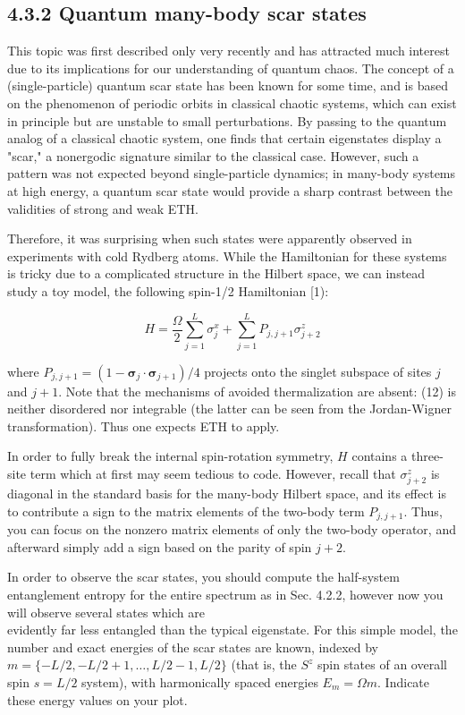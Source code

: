 \documentclass[12pt]{article}
\begin{document}
\subsection*{4.3.2 Quantum many-body scar states}
This topic was first described only very recently and has attracted much interest due to its implications for our understanding of quantum chaos. The concept of a (single-particle) quantum scar state has been known for some time, and is based on the phenomenon of periodic orbits in classical chaotic systems, which can exist in principle but are unstable to small perturbations. By passing to the quantum analog of a classical chaotic system, one finds that certain eigenstates display a "scar," a nonergodic signature similar to the classical case. However, such a pattern was not expected beyond single-particle dynamics; in many-body systems at high energy, a quantum scar state would provide a sharp contrast between the validities of strong and weak ETH.

Therefore, it was surprising when such states were apparently observed in experiments with cold Rydberg atoms. While the Hamiltonian for these systems is tricky due to a complicated structure in the Hilbert space, we can instead study a toy model, the following spin-1/2 Hamiltonian [1):


\begin{equation*}
H=\frac{\Omega}{2} \sum_{j=1}^{L} \sigma_{j}^{x}+\sum_{j=1}^{L} P_{j, j+1} \sigma_{j+2}^{z} \tag{12}
\end{equation*}


where $P_{j, j+1}=\left(1-\boldsymbol{\sigma}_{j} \cdot \boldsymbol{\sigma}_{j+1}\right) / 4$ projects onto the singlet subspace of sites $j$ and $j+1$. Note that the mechanisms of avoided thermalization are absent: (12) is neither disordered nor integrable (the latter can be seen from the Jordan-Wigner transformation). Thus one expects ETH to apply.

In order to fully break the internal spin-rotation symmetry, $H$ contains a three-site term which at first may seem tedious to code. However, recall that $\sigma_{j+2}^{z}$ is diagonal in the standard basis for the many-body Hilbert space, and its effect is to contribute a sign to the matrix elements of the two-body term $P_{j, j+1}$. Thus, you can focus on the nonzero matrix elements of only the two-body operator, and afterward simply add a sign based on the parity of spin $j+2$.

In order to observe the scar states, you should compute the half-system entanglement entropy for the entire spectrum as in Sec. 4.2.2, however now you will observe several states which are\\
evidently far less entangled than the typical eigenstate. For this simple model, the number and exact energies of the scar states are known, indexed by $m=\{-L / 2,-L / 2+1, \ldots, L / 2-1, L / 2\}$ (that is, the $S^{z}$ spin states of an overall spin $s=L / 2$ system), with harmonically spaced energies $E_{m}=\Omega m$. Indicate these energy values on your plot.
\end{document}
